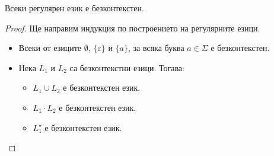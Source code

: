 \begin{framed}
  \begin{thm}
    Всеки регулярен език е безконтекстен.
  \end{thm}
\end{framed}
\begin{proof}
  Ще направим индукция по построението на регулярните езици.
  \begin{itemize}
  \item
    Всеки от езиците $\emptyset$, $\{\varepsilon\}$ и $\{a\}$, за всяка буква $a \in \Sigma$ е безконтекстен.
  \item
    Нека $L_1$ и $L_2$ са безконтекстни езици. Тогава:
    \begin{itemize}
    \item
      $L_1 \cup L_2$ е безконтекстен език.
    \item
      $L_1 \cdot L_2$ е безконтекстен език.
    \item
      $L^\star_1$ е безконтекстен език.
    \end{itemize}
  \end{itemize}
\end{proof}

